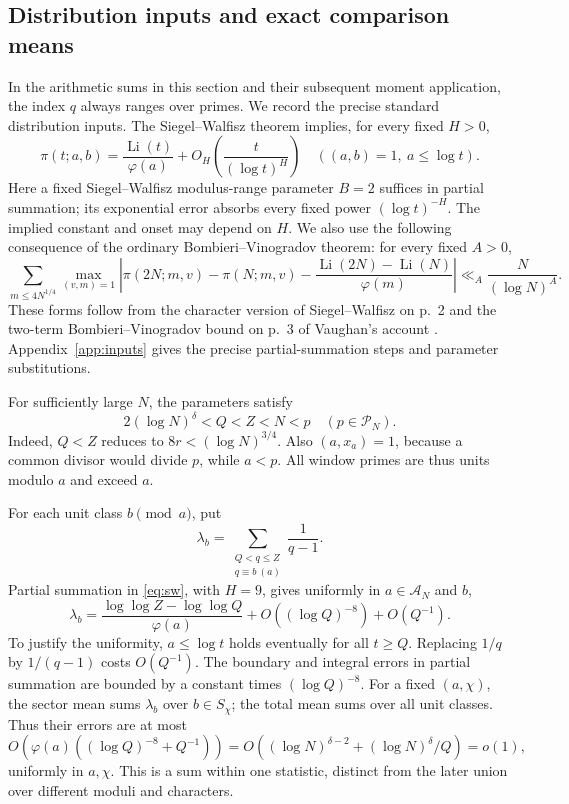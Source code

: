 \documentclass[11pt]{article}
\theoremstyle{remark}\newtheorem{remark}[theorem]{Remark}
\newcommand{\Li}{\operatorname{Li}}
\newcommand{\cP}{\mathcal P}
\newcommand{\cA}{\mathcal A}
\begin{document}
\subsection{Distribution inputs and exact comparison means}
In the arithmetic sums in this section and their subsequent moment
application, the index $q$ always ranges over primes.
We record the precise standard distribution inputs. The
Siegel--Walfisz theorem implies, for every fixed $H>0$,
\begin{equation}\label{eq:sw}
 \pi(t;a,b)=\frac{\Li(t)}{\varphi(a)}
                +O_H\left(\frac{t}{(\log t)^H}\right)
 \quad ((a,b)=1,\ a\le\log t).
\end{equation}
Here a fixed Siegel--Walfisz modulus-range parameter $B=2$ suffices
in partial summation; its exponential error absorbs every fixed power
$(\log t)^{-H}$. The implied constant and onset may depend on $H$.
We also use the following consequence of the ordinary
Bombieri--Vinogradov theorem: for every fixed $A>0$,
\begin{equation}\label{eq:bv}
 \sum_{m\le4N^{1/4}}\max_{(v,m)=1}
 \left|\pi(2N;m,v)-\pi(N;m,v)
 -\frac{\Li(2N)-\Li(N)}{\varphi(m)}\right|
 \ll_A\frac{N}{(\log N)^A}.
\end{equation}
These forms follow from the character version of Siegel--Walfisz on
p.~2 and the two-term Bombieri--Vinogradov bound on p.~3 of
Vaughan's account \cite{VaughanBV}. Appendix~\ref{app:inputs} gives the
precise partial-summation steps and parameter substitutions.


For sufficiently large $N$, the parameters satisfy
\begin{equation}\label{eq:range}
 2(\log N)^\delta<Q<Z<N<p\quad(p\in\cP_N).
\end{equation}
Indeed, $Q<Z$ reduces to $8r<(\log N)^{3/4}$. Also $(a,x_a)=1$,
because a common divisor would divide $p$, while $a<p$.
All window primes are thus units modulo $a$ and exceed $a$.

For each unit class $b\pmod a$, put
\[
 \lambda_b=\sum_{\substack{Q<q\le Z\\q\equiv b\ (a)}}\frac1{q-1}.
\]
Partial summation in \eqref{eq:sw}, with $H=9$, gives uniformly in
$a\in\cA_N$ and $b$,
\begin{equation}\label{eq:lambda}
 \lambda_b=\frac{\log\log Z-\log\log Q}{\varphi(a)}
 +O((\log Q)^{-8})+O(Q^{-1}).
\end{equation}
To justify the uniformity, $a\le\log t$ holds eventually for all $t\ge Q$.
Replacing $1/q$ by $1/(q-1)$ costs $O(Q^{-1})$. The boundary and integral
errors in partial summation are bounded by a constant times
$(\log Q)^{-8}$. For a fixed $(a,\chi)$, the sector mean sums
$\lambda_b$ over $b\in S_\chi$; the total mean sums over all unit classes.
Thus their errors are at most
\[
 O\!\left(\varphi(a)((\log Q)^{-8}+Q^{-1})\right)
 =O\!\left((\log N)^{\delta-2}+(\log N)^\delta/Q\right)=o(1),
\]
uniformly in $a,\chi$. This is a sum within one statistic, distinct from
the later union over different moduli and characters.
\end{document}
